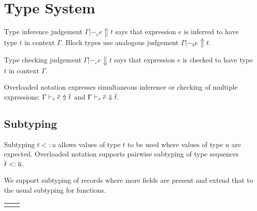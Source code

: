 \documentclass[11pt]{article}
\begin{document}
\newpage

\section{Type System}

\newcommand{\inft}[4]{#2 |-_#1 #3 \Uparrow #4}
\newcommand{\infe}[3]{\inft{e}{#1}{#2}{#3}}
\newcommand{\infb}[3]{\inft{b}{#1}{#2}{#3}}

\newcommand{\chkt}[4]{#2 |-_#1 #3 \Downarrow #4}
\newcommand{\chke}[3]{\chkt{e}{#1}{#2}{#3}}

\newcommand{\rulename}[1]{{\footnotesize #1}}

\newenvironment{rules}[1]
    {\begin{center}\begin{tabular}{#1}}
    {\end{tabular}\end{center}}

Type inference judgement $\infe{\Gamma}{e}{t}$ says that expression $e$ is inferred to have type $t$ in context $\Gamma$.
Block types use analogous judgement $\infb{\Gamma}{e}{t}$.

Type checking judgement $\chke{\Gamma}{e}{t}$ says that expression $e$ is checked to have type $t$ in context $\Gamma$.

Overloaded notation expresses simultaneous inference or checking of multiple expressions: $\infe{\Gamma}{\repo{e}}{\repo{t}}$ and $\chke{\Gamma}{\repo{e}}{\repo{t}}$.

\subsection{Subtyping}

\newcommand{\subtype}[2]{#1 <: #2}

Subtyping $\subtype{t}{u}$ allows values of type $t$ to be used where values of type $u$ are expected.
Overloaded notation supports pairwise subtyping of type sequences $\subtype{\repo{t}}{\repo{u}}$.

We support subtyping of records where more fields are present and extend that to the usual subtyping for functions.

\begin{rules}{cc}

\inference[T-REF]{
  \
}{
  \subtype{t}{t}
}

&

\inference[T-REC]{
  \subs{\rowty{y}{u}}{\rowty{x}{t}}
}{
  \subtype{\recty{\rowty{x}{t}}}{\recty{\rowty{y}{u}}}
}

\end{rules}
\end{document}
